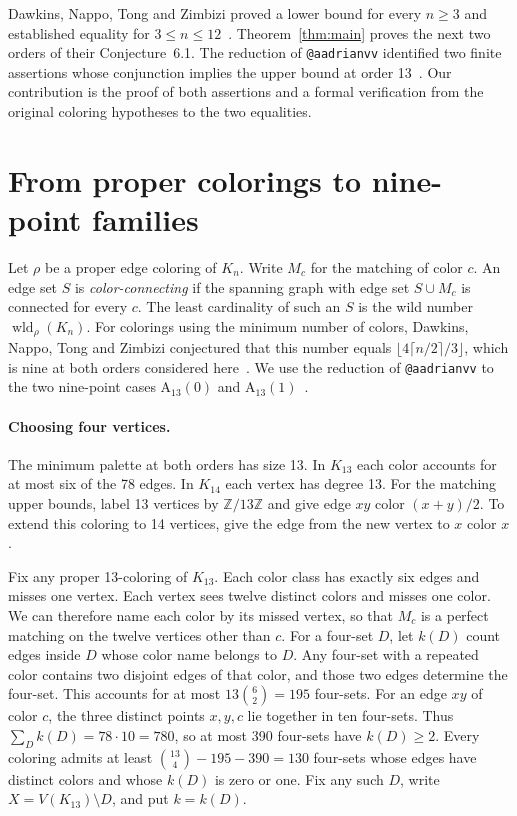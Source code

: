 \documentclass[11pt]{article}
\begin{document}
Dawkins, Nappo, Tong and Zimbizi proved a lower bound for every $n\geq3$
and established equality for $3\leq n\leq12$~\cite[Theorems 3.4 and 3.5]{dawkins}.
Theorem~\ref{thm:main} proves the next two orders of their Conjecture~6.1.
The reduction of \texttt{@aadrianvv} identified two finite assertions
whose conjunction implies the upper bound at order 13~\cite{adrian}.
Our contribution is the proof of both assertions and a formal verification
from the original coloring hypotheses to the two equalities.

\section{From proper colorings to nine-point families}\label{sec:reduction}

Let $\rho$ be a proper edge coloring of $K_n$. Write $M_c$ for the
matching of color $c$. An edge set $S$ is \emph{color-connecting} if the
spanning graph with edge set $S\cup M_c$ is connected for every $c$.
The least cardinality of such an $S$ is the wild number
$\operatorname{wld}_{\rho}(K_n)$. For colorings using the minimum number
of colors, Dawkins, Nappo, Tong and Zimbizi conjectured that this number
equals $\lfloor 4\lceil n/2\rceil/3\rfloor$, which is nine at both orders
considered here~\cite[Conjecture~6.1]{dawkins}. We use the reduction of
\texttt{@aadrianvv} to the two nine-point cases $\mathrm{A}_{13}(0)$ and
$\mathrm{A}_{13}(1)$~\cite[\S4]{adrian}.

\paragraph{Choosing four vertices.}
The minimum palette at both orders has size 13. In $K_{13}$ each color
accounts for at most six of the 78 edges. In $K_{14}$ each vertex has
degree 13. For the matching upper bounds, label 13 vertices by
$\mathbb Z/13\mathbb Z$ and give edge $xy$ color $(x+y)/2$. To extend
this coloring to 14 vertices, give the edge from the new vertex to $x$
color $x$.

Fix any proper 13-coloring of $K_{13}$. Each color class has exactly six
edges and misses one vertex. Each vertex sees twelve distinct colors and
misses one color. We can therefore name each color by its missed vertex,
so that $M_c$ is a perfect matching on the twelve vertices other than $c$.
For a four-set $D$, let $k(D)$ count edges inside $D$ whose color name
belongs to $D$. Any four-set with a repeated color contains two disjoint
edges of that color, and those two edges determine the four-set. This
accounts for at most $13\binom{6}{2}=195$ four-sets. For an edge $xy$ of
color $c$, the three distinct points $x,y,c$ lie together in ten
four-sets. Thus $\sum_D k(D)=78\cdot 10=780$, so at most 390 four-sets
have $k(D)\geq 2$. Every coloring admits at least
$\binom{13}{4}-195-390=130$ four-sets whose edges have distinct
colors and whose $k(D)$ is zero or one. Fix any such $D$, write
$X=V(K_{13})\setminus D$, and put $k=k(D)$.
\end{document}
